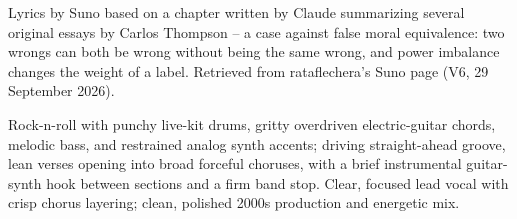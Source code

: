 
\begin{notes}
Lyrics by Suno based on a chapter written by Claude summarizing several original essays by Carlos Thompson -- a case against false moral equivalence: two wrongs can both be wrong without being the same wrong, and power imbalance changes the weight of a label. Retrieved from rataflechera's Suno page (V6, 29 September 2026).
\end{notes}
\begin{style}
Rock-n-roll with punchy live-kit drums, gritty overdriven electric-guitar chords, melodic bass, and restrained analog synth accents; driving straight-ahead groove, lean verses opening into broad forceful choruses, with a brief instrumental guitar-synth hook between sections and a firm band stop. Clear, focused lead vocal with crisp chorus layering; clean, polished 2000s production and energetic mix.
\end{style}
